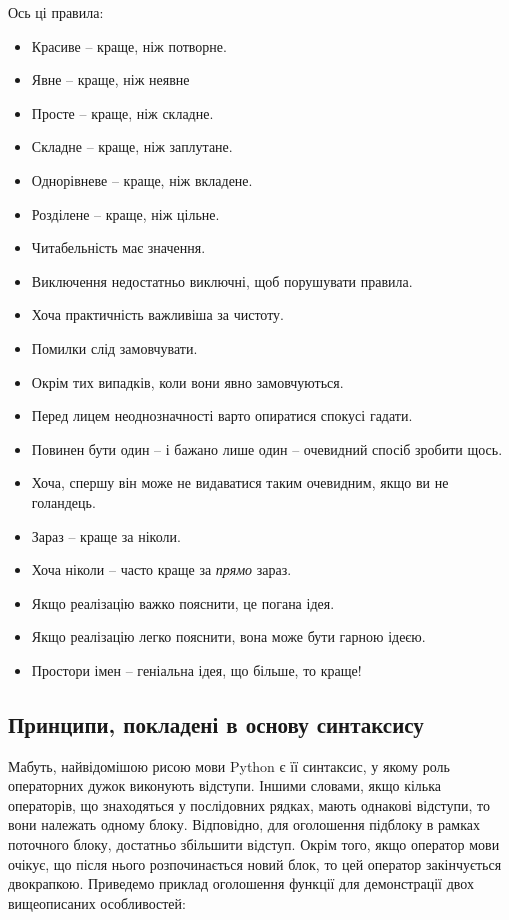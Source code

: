 \documentclass[a4paper, 12pt, onsedie]{article}
\begin{document}
Ось ці правила:
\begin{itemize}
    \item Красиве -- краще, ніж потворне.
    \item Явне -- краще, ніж неявне
    \item Просте -- краще, ніж складне.
    \item Складне -- краще, ніж заплутане.
    \item Однорівневе -- краще, ніж вкладене.
    \item Розділене -- краще, ніж цільне.
    \item Читабельність має значення.
    \item Виключення недостатньо виключні, щоб порушувати правила.
    \item Хоча практичність важливіша за чистоту.
    \item Помилки слід замовчувати.
    \item Окрім тих випадків, коли вони явно замовчуються.
    \item Перед лицем неоднозначності варто опиратися спокусі гадати.
    \item Повинен бути один -- і бажано лише один -- очевидний спосіб зробити щось.
    \item Хоча, спершу він може не видаватися таким очевидним, якщо ви не голандець.
    \item Зараз -- краще за ніколи.
    \item Хоча ніколи -- часто краще за \emph{прямо} зараз.
    \item Якщо реалізацію важко пояснити, це погана ідея.
    \item Якщо реалізацію легко пояснити, вона може бути гарною ідеєю.
    \item Простори імен -- геніальна ідея, що більше, то краще!
\end{itemize}

\subsection{Принципи, покладені в основу синтаксису}
Мабуть, найвідомішою рисою мови Python є її синтаксис, у якому роль операторних дужок
виконують відступи. Іншими словами, якщо кілька операторів, що знаходяться у послідовних 
рядках, мають однакові відступи, то вони належать одному блоку. Відповідно, для оголошення
підблоку в рамках поточного блоку, достатньо збільшити відступ. Окрім того, якщо оператор
мови очікує, що після нього розпочинається новий блок, то цей оператор закінчується 
двокрапкою. Приведемо приклад оголошення функції для демонстрації двох вищеописаних
особливостей:
\end{document}
